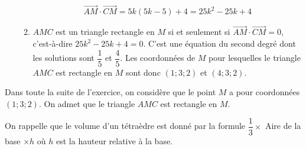 \documentclass[11pt,fleqn, openany]{book} %
\begin{document}
\begin{solution}
\begin{enumerate}
\begin{enumerate}
\[\overrightarrow{AM} \cdot \overrightarrow{CM} = 5k(5k-5)+4=25k^2-25k+4\]
\item $AMC$ est un triangle rectangle en $M$ si et seulement si $\overrightarrow{AM} \cdot \overrightarrow{CM}=0$, c'est-à-dire $25k^2-25k+4=0$. C'est une équation du second degré dont les solutions sont $\dfrac{1}{5}$ et $\dfrac{4}{5}$. Les coordonnées de $M$ pour lesquelles le triangle $AMC$ est rectangle en $M$ sont donc $(1;3;2)$ et $(4;3;2)$.\end{enumerate}\end{enumerate}
Dans toute la suite de l'exercice, on considère que le point $M$ a pour coordonnées $(1; 3; 2)$. On admet que le triangle $AMC$ est rectangle en $M$.

On rappelle que le volume d'un tétraèdre est donné par la formule $\dfrac{1}{3} \times$ Aire de la base $\times
 h$ où $h$ est la hauteur relative à la base.
 

\end{solution}
\end{document}
